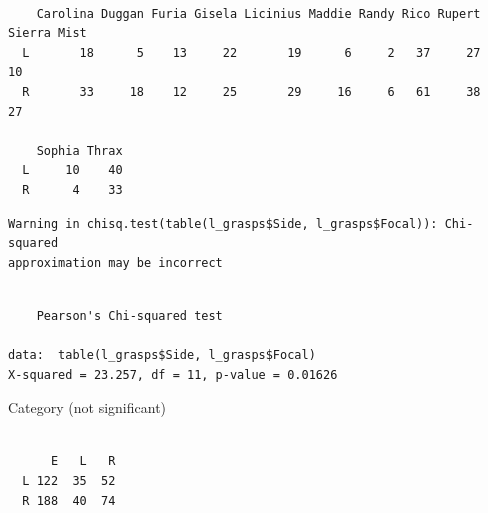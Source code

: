 \documentclass[
  letterpaper,
  DIV=11,
  numbers=noendperiod]{scrartcl}
\newenvironment{Shaded}{\begin{snugshade}}{\end{snugshade}}
\newcommand{\FunctionTok}[1]{\textcolor[rgb]{0.28,0.35,0.67}{#1}}
\newcommand{\NormalTok}[1]{\textcolor[rgb]{0.00,0.23,0.31}{#1}}
\newcommand{\SpecialCharTok}[1]{\textcolor[rgb]{0.37,0.37,0.37}{#1}}
\begin{document}
\begin{verbatim}
   
    Carolina Duggan Furia Gisela Licinius Maddie Randy Rico Rupert Sierra Mist
  L       18      5    13     22       19      6     2   37     27          10
  R       33     18    12     25       29     16     6   61     38          27
   
    Sophia Thrax
  L     10    40
  R      4    33
\end{verbatim}

\begin{Shaded}
\end{Shaded}

\begin{verbatim}
Warning in chisq.test(table(l_grasps$Side, l_grasps$Focal)): Chi-squared
approximation may be incorrect
\end{verbatim}

\begin{verbatim}

    Pearson's Chi-squared test

data:  table(l_grasps$Side, l_grasps$Focal)
X-squared = 23.257, df = 11, p-value = 0.01626
\end{verbatim}

Category (not significant)

\begin{Shaded}
\end{Shaded}

\begin{verbatim}
   
      E   L   R
  L 122  35  52
  R 188  40  74
\end{verbatim}

\begin{Shaded}
\end{Shaded}
\end{document}

